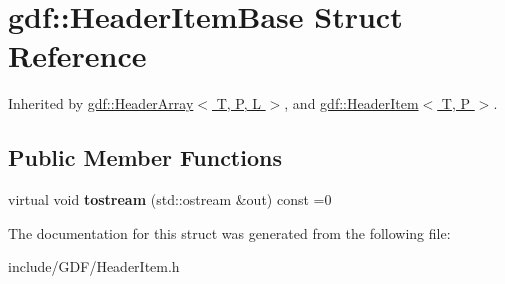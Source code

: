 \hypertarget{structgdf_1_1_header_item_base}{
\section{gdf::HeaderItemBase Struct Reference}
\label{structgdf_1_1_header_item_base}
}


Inherited by \hyperlink{structgdf_1_1_header_array}{gdf::HeaderArray$<$ T, P, L $>$}, and \hyperlink{structgdf_1_1_header_item}{gdf::HeaderItem$<$ T, P $>$}.

\subsection*{Public Member Functions}
\begin{DoxyCompactItemize}
\item 
\hypertarget{structgdf_1_1_header_item_base_a2e31b4b08ee7131198881a9f6b05af68}{
virtual void {\bfseries tostream} (std::ostream \&out) const =0}
\label{structgdf_1_1_header_item_base_a2e31b4b08ee7131198881a9f6b05af68}

\end{DoxyCompactItemize}


The documentation for this struct was generated from the following file:\begin{DoxyCompactItemize}
\item 
include/GDF/HeaderItem.h\end{DoxyCompactItemize}
